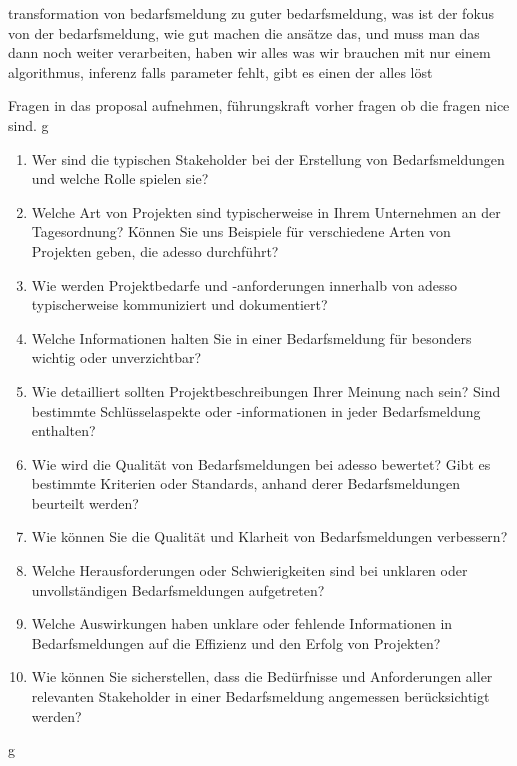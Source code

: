 transformation von bedarfsmeldung zu guter bedarfsmeldung, was ist der fokus von der bedarfsmeldung, wie gut machen die ansätze das, und muss man das dann noch weiter verarbeiten, haben wir alles was wir brauchen mit nur einem algorithmus, inferenz falls parameter fehlt, gibt es einen der alles löst

Fragen in das proposal aufnehmen, führungskraft vorher fragen ob die fragen nice sind.
\newpage
g
\begin{enumerate}
	\item Wer sind die typischen Stakeholder bei der Erstellung von Bedarfsmeldungen und welche
	Rolle spielen sie?
	\item Welche Art von Projekten sind typischerweise in Ihrem Unternehmen an der Tagesordnung?
	Können Sie uns Beispiele für verschiedene Arten von Projekten geben, die adesso
	durchführt?
	\item Wie werden Projektbedarfe und -anforderungen innerhalb von adesso typischerweise
	kommuniziert und dokumentiert?
	\item Welche Informationen halten Sie in einer Bedarfsmeldung für besonders wichtig oder
	unverzichtbar?
	\item Wie detailliert sollten Projektbeschreibungen Ihrer Meinung nach sein? Sind bestimmte
	Schlüsselaspekte oder -informationen in jeder Bedarfsmeldung enthalten?
	\item Wie wird die Qualität von Bedarfsmeldungen bei adesso bewertet? Gibt es bestimmte
	Kriterien oder Standards, anhand derer Bedarfsmeldungen beurteilt werden?
	\item Wie können Sie die Qualität und Klarheit von Bedarfsmeldungen verbessern?
	\item Welche Herausforderungen oder Schwierigkeiten sind bei unklaren oder unvollständigen
	Bedarfsmeldungen aufgetreten?
	\item Welche Auswirkungen haben unklare oder fehlende Informationen in Bedarfsmeldungen
	auf die Effizienz und den Erfolg von Projekten?
	\item Wie können Sie sicherstellen, dass die Bedürfnisse und Anforderungen aller relevanten
	Stakeholder in einer Bedarfsmeldung angemessen berücksichtigt werden?
\end{enumerate}
\newpage
g
\newpage